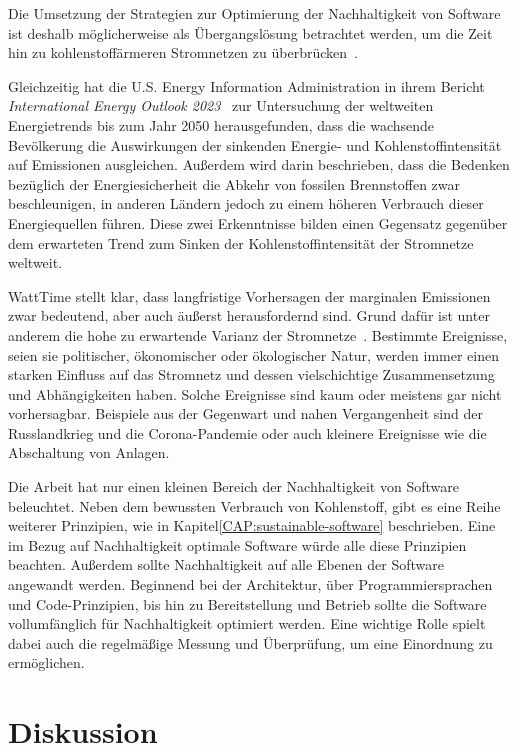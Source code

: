 Die Umsetzung der Strategien zur Optimierung der Nachhaltigkeit von Software ist deshalb möglicherweise als Übergangslösung betrachtet werden, um die Zeit hin zu kohlenstoffärmeren Stromnetzen zu überbrücken~\cite{WattTime.12.3.2024}.

Gleichzeitig hat die U.S. Energy Information Administration in ihrem Bericht \textit{International Energy Outlook 2023}~\cite{U.S.EnergyInformationAdministration.2023} zur Untersuchung der weltweiten Energietrends bis zum Jahr 2050 herausgefunden, dass die wachsende Bevölkerung die Auswirkungen der sinkenden Energie- und Kohlenstoffintensität auf Emissionen ausgleichen.
Außerdem wird darin beschrieben, dass die Bedenken bezüglich der Energiesicherheit die Abkehr von fossilen Brennstoffen zwar beschleunigen, in anderen Ländern jedoch zu einem höheren Verbrauch dieser Energiequellen führen.
Diese zwei Erkenntnisse bilden einen Gegensatz gegenüber dem erwarteten Trend zum Sinken der Kohlenstoffintensität der Stromnetze weltweit.


WattTime stellt klar, dass langfristige Vorhersagen der marginalen Emissionen zwar bedeutend, aber auch äußerst herausfordernd sind.
Grund dafür ist unter anderem die hohe zu erwartende Varianz der Stromnetze~\cite{WattTime.2022}.
Bestimmte Ereignisse, seien sie politischer, ökonomischer oder ökologischer Natur, werden immer einen starken Einfluss auf das Stromnetz und dessen vielschichtige Zusammensetzung und Abhängigkeiten haben.
Solche Ereignisse sind kaum oder meistens gar nicht vorhersagbar.
Beispiele aus der Gegenwart und nahen Vergangenheit sind der Russlandkrieg und die Corona-Pandemie oder auch kleinere Ereignisse wie die Abschaltung von Anlagen.

Die Arbeit hat nur einen kleinen Bereich der Nachhaltigkeit von Software beleuchtet.
Neben dem bewussten Verbrauch von Kohlenstoff, gibt es eine Reihe weiterer Prinzipien, wie in Kapitel\ref{CAP:sustainable-software} beschrieben.
Eine im  Bezug auf Nachhaltigkeit optimale Software würde alle diese Prinzipien beachten.
Außerdem sollte Nachhaltigkeit auf alle Ebenen der Software angewandt werden.
Beginnend bei der Architektur, über Programmiersprachen und Code-Prinzipien, bis hin zu Bereitstellung und Betrieb sollte die Software vollumfänglich für Nachhaltigkeit optimiert werden.
Eine wichtige Rolle spielt dabei auch die regelmäßige Messung und Überprüfung, um eine Einordnung zu ermöglichen.
\chapter{Diskussion}
